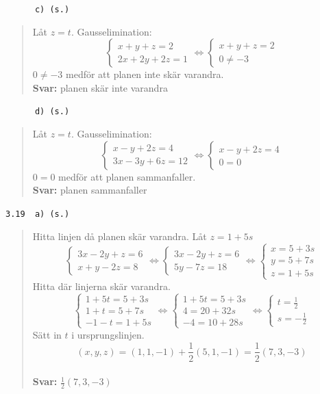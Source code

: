 \documentclass[a4paper]{article}
\newcommand{\tskcol}[1]{\textcolor{tskcol}{#1}}
\begin{document}
\texttt{\tskcol{~~~~~~c) (s.)}}
\begin{quotation}
	\noindent
	Låt $z=t$. Gausselimination:
	\[\begin{cases}
	x+y+z=2 \\
	2x+2y+2z=1
	\end{cases} \Leftrightarrow
	\begin{cases}
	x+y+z=2 \\
	0\neq-3
	\end{cases}\]
	$0\neq-3$ medför att planen inte skär varandra.
	\\
	\textbf{Svar:} planen skär inte varandra
\end{quotation}

\texttt{\tskcol{~~~~~~d) (s.)}}
\begin{quotation}
	\noindent
	Låt $z=t$. Gausselimination:
	\[\begin{cases}
	x-y+2z=4 \\
	3x-3y+6z=12
	\end{cases} \Leftrightarrow
	\begin{cases}
	x-y+2z=4 \\
	0=0
	\end{cases}\]
	$0=0$ medför att planen sammanfaller.
	\\
	\textbf{Svar:} planen sammanfaller
\end{quotation}

\texttt{\tskcol{3.19~~a) (s.)}}
\begin{quotation}
	\noindent
	Hitta linjen då planen skär varandra. Låt $z=1+5s$
	\[\begin{cases}
	3x-2y+z=6 \\
	x+y-2z=8
	\end{cases} \Leftrightarrow
	\begin{cases}
	3x-2y+z=6 \\
	5y-7z=18
	\end{cases} \Leftrightarrow
	\begin{cases}
	x=5+3s \\
	y=5+7s \\
	z=1+5s
	\end{cases}\]
	Hitta där linjerna skär varandra.
	\[\begin{cases}
	1+5t=5+3s \\
	1+t=5+7s \\
	-1-t=1+5s
	\end{cases} \Leftrightarrow
	\begin{cases}
	1+5t=5+3s \\
	4=20+32s \\
	-4=10+28s
	\end{cases} \Leftrightarrow
	\begin{cases}
	t=\frac{1}{2} \\
	s=-\frac{1}{2}
	\end{cases}
	\]
	Sätt in $t$ i ursprungslinjen.
	\[(x,y,z)=(1,1,-1)+\frac{1}{2}(5,1,-1)=\frac{1}{2}(7,3,-3)\]
	\\
	\textbf{Svar:} $\frac{1}{2}(7,3,-3)$
\end{quotation}
\end{document}
